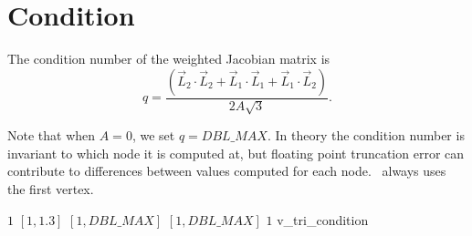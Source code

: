 \section{Condition\label{s:tri-condition}}

The condition number of the weighted Jacobian matrix is
\[
  q = \frac{
    \left(\vec L_2\cdot\vec L_2 + \vec L_1\cdot\vec L_1 + \vec L_1\cdot\vec L_2 \right)}%
    {2A\sqrt{3}}.
\]

Note that when $A = 0$, we set $q = DBL\_MAX$.
In theory the condition number is invariant to which node it is computed at,
but floating point truncation error can contribute to differences between
values computed for each node.
\verd\ always uses the first vertex.

%
{$1$}%
{$[1,1.3]$}%
{$[1,DBL\_MAX]$}%
{$[1,DBL\_MAX]$}%
{$1$}%
{\cite{knu:00,knu:03}}%
{v\_tri\_condition}%

